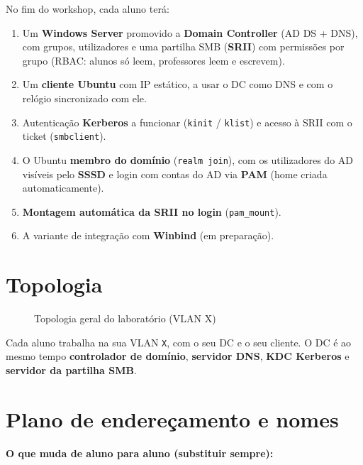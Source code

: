 \documentclass[11pt,a4paper,oneside]{report}
\newcommand{\esquemadir}{latex/esquemas/}
\providecommand{\esquemadir}{esquemas/}
\newcommand{\esquema}[2]{%
  \begin{figure}[H]
    \centering
    \adjustbox{max width=\linewidth}{}
    \caption{#2}
  \end{figure}}
\begin{document}
No fim do workshop, cada aluno terá:

\begin{enumerate}
\item Um \textbf{Windows Server} promovido a \textbf{Domain Controller} (AD DS + DNS), com grupos, utilizadores e uma partilha SMB (\textbf{SRII}) com permissões por grupo (RBAC: alunos só leem, professores leem e escrevem).
\item Um \textbf{cliente Ubuntu} com IP estático, a usar o DC como DNS e com o relógio sincronizado com ele.
\item Autenticação \textbf{Kerberos} a funcionar (\texttt{kinit} / \texttt{klist}) e acesso à SRII com o ticket (\texttt{smbclient}).
\item O Ubuntu \textbf{membro do domínio} (\texttt{realm join}), com os utilizadores do AD visíveis pelo \textbf{SSSD} e login com contas do AD via \textbf{PAM} (home criada automaticamente).
\item \textbf{Montagem automática da SRII no login} (\texttt{pam\_mount}).
\item A variante de integração com \textbf{Winbind} (em preparação).
\end{enumerate}

\section*{Topologia}

\esquema{00-topologia}{Topologia geral do laboratório (VLAN X)}

Cada aluno trabalha na sua VLAN \texttt{X}, com o seu DC e o seu cliente. O DC é ao mesmo tempo \textbf{controlador de domínio}, \textbf{servidor DNS}, \textbf{KDC Kerberos} e \textbf{servidor da partilha SMB}.

\section*{Plano de endereçamento e nomes}

\textbf{O que muda de aluno para aluno (substituir sempre):}
\end{document}
